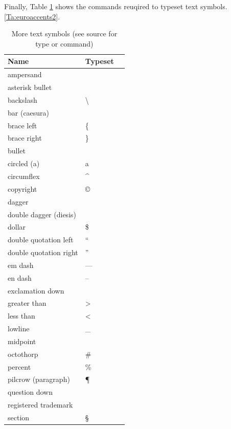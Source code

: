 \documentclass{sample}
\begin{document}
Finally, Table \ref{Ta:symbols} shows the commands reuqired to typeset text symbols.
\ref{Ta:euroaccents2}.
\begin{table}
\begin{center}
	\begin{tabular}{llc}
	\toprule
	Name & Typeset\\
	\midrule
	ampersand & \\
	asterisk bullet & \textasteriskcentered\\
	backslash & \textbackslash\\
	bar (caesura) & \textbar\\
	brace left & \{\\
	brace right & \}\\
	bullet & \textbullet\\
	circled (a) & \textcircled{a}\\
	circumflex & \textasciicircum\\
	copyright & \copyright\\
	dagger & \dag\\
	double dagger (diesis) & \ddag\\
	dollar& \$\\
	double quotation left & ``\\
	double quotation right & ''\\
	em dash & ---\\
	en dash & --\\
	exclamation down & \textexclamdown\\
	greater than & \textgreater\\
	less than & \textless\\
	lowline & \_\\
	midpoint & \textperiodcentered\\
	octothorp & \#\\
	percent & \%\\
	pilcrow (paragraph) & \P\\
	question down & \textquestiondown\\
	registered trademark & \textregistered\\
	section & \S\\
	\bottomrule
	\end{tabular}
	\caption{More text symbols (see source for type or command)}
	\label{Ta:symbols}
\end{center}
\end{table}
\end{document}
